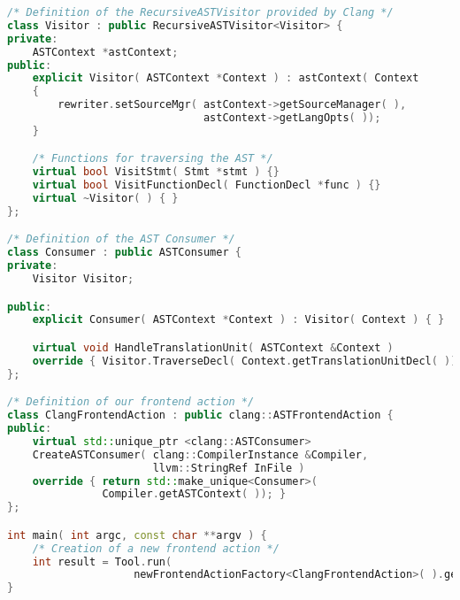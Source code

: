 \begin{lstlisting}[float, language=C++, caption={[Framework for Accessing the \AST Provided by \CLANG.]Code Framework for Accessing the \AST Provided by \CLANG.}, label=lst:b:clang_libtooling]
/* Definition of the RecursiveASTVisitor provided by Clang */
class Visitor : public RecursiveASTVisitor<Visitor> {
private:
    ASTContext *astContext;
public:
    explicit Visitor( ASTContext *Context ) : astContext( Context 
    {
        rewriter.setSourceMgr( astContext->getSourceManager( ),
                               astContext->getLangOpts( ));
    }

    /* Functions for traversing the AST */
    virtual bool VisitStmt( Stmt *stmt ) {}
    virtual bool VisitFunctionDecl( FunctionDecl *func ) {}
    virtual ~Visitor( ) { }
};

/* Definition of the AST Consumer */
class Consumer : public ASTConsumer {
private:
    Visitor Visitor;

public:
    explicit Consumer( ASTContext *Context ) : Visitor( Context ) { }

    virtual void HandleTranslationUnit( ASTContext &Context ) 
    override { Visitor.TraverseDecl( Context.getTranslationUnitDecl( )); }
};

/* Definition of our frontend action */
class ClangFrontendAction : public clang::ASTFrontendAction {
public:
    virtual std::unique_ptr <clang::ASTConsumer>
    CreateASTConsumer( clang::CompilerInstance &Compiler, 
                       llvm::StringRef InFile ) 
    override { return std::make_unique<Consumer>( 
               Compiler.getASTContext( )); }
};

int main( int argc, const char **argv ) {
    /* Creation of a new frontend action */
    int result = Tool.run( 
                    newFrontendActionFactory<ClangFrontendAction>( ).get( ));
}
\end{lstlisting}

